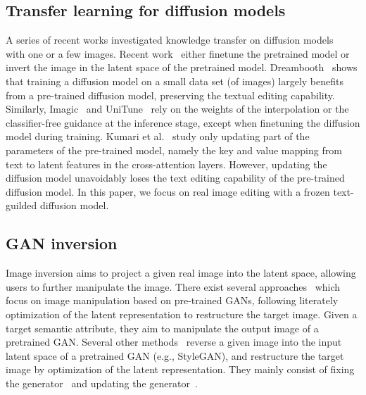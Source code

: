 \documentclass[twocolumn]{svjour3}          \smartqed  \usepackage{graphicx}
\begin{document}
\subsection{Transfer learning for diffusion models}
A series of recent works investigated knowledge transfer on diffusion models~\citep{song2020denoising,liu2023accelerating,mokady2022null,gal2022image,avrahami2023break,kwon2022diffusion,kim2022diffusionclip,gal2023encoder,xiao2023fastcomposer,han2023highly,tewel2023key,kumari2023multi,zhang2023prospect,dong2023prompt} with one or a few images. 
Recent work~\citep{Kawar2022ImagicTR,meng2021sdedit,cao2023masactrl,zhang2023adding,couairon2022diffedit,mou2023dragondiffusion,jia2023taming,zhang2023continuous,qiu2023controlling,levin2023differential,chen2023training}  either finetune the pretrained model or invert the image in the latent space of the  pretrained model. 
Dreambooth~\citep{ruiz2022dreambooth} shows that training a diffusion model on a small data set (of  images) largely benefits from a pre-trained diffusion model, preserving the textual editing capability. Similarly,  Imagic~\citep{Kawar2022ImagicTR} and UniTune~\citep{valevski2022unitune} rely on the weights of the interpolation or the classifier-free guidance at the inference stage, except when finetuning the diffusion model during training. Kumari et al.~\citep{kumari2022multi} study only updating part of the parameters of the pre-trained model, namely the key and value mapping from text to latent features in the cross-attention layers.  
However, updating the diffusion model unavoidably loses the text editing capability of the pre-trained diffusion model. In this paper, we focus on real image editing with a frozen text-guilded diffusion model.

\subsection{GAN inversion}
Image inversion aims to project a given real image into the latent space,  allowing users to further manipulate the image. There exist several approaches~\citep{bermano2022state,creswell2018inverting,goetschalckx2019ganalyze,jahanian2019steerability,lipton2017precise,  xia2021gan,yeh2017semantic,zhu2016generative}  which focus on image manipulation based on pre-trained GANs, following literately optimization of the latent representation to restructure the target image.  Given a target semantic attribute, they aim to manipulate the output image 
of a pretrained GAN. Several other methods~\citep{abdal2019image2stylegan,zhu2020domain} reverse a given image into the input latent space of a pretrained GAN (e.g., StyleGAN), 
and restructure the target image by optimization of the latent representation.  They mainly consist of  fixing the generator~\cite{abdal2019image2stylegan,abdal2020image2stylegan++, richardson2020encoding,tov2021designing} and updating the generator~\cite{alaluf2021hyperstyle,roich2021pivotal}.
\end{document}
